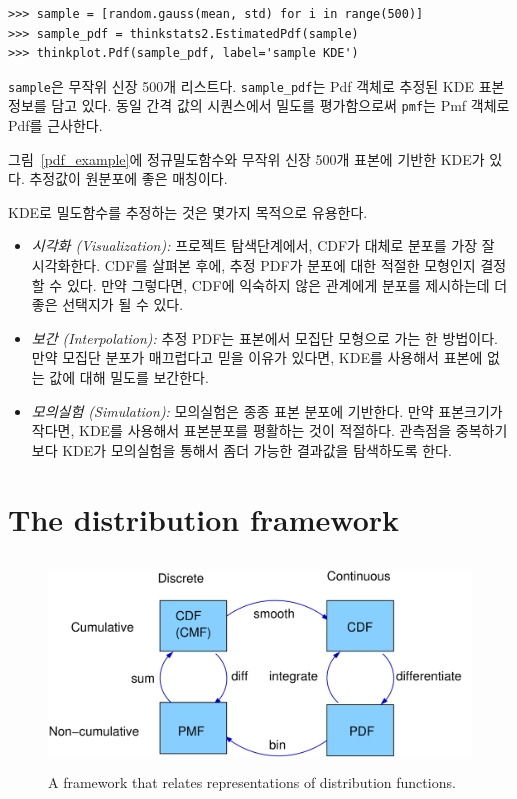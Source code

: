 \begin{verbatim}
>>> sample = [random.gauss(mean, std) for i in range(500)]
>>> sample_pdf = thinkstats2.EstimatedPdf(sample)
>>> thinkplot.Pdf(sample_pdf, label='sample KDE')
\end{verbatim}

\verb"sample"은 무작위 신장 500개 리스트다. 
\verb"sample_pdf"는 Pdf 객체로 추정된 KDE 표본정보를 담고 있다.
동일 간격 값의 시퀀스에서 밀도를 평가함으로써 {\tt pmf}는 Pmf 객체로 Pdf를 근사한다.

그림~\ref{pdf_example}에 정규밀도함수와 무작위 신장 500개 표본에 기반한 KDE가 있다. 추정값이 원분포에 좋은 매칭이다.

KDE로 밀도함수를 추정하는 것은 몇가지 목적으로 유용한다. 


\begin{itemize}

\item {\it 시각화 (Visualization):} 
  프로젝트 탐색단계에서, CDF가 대체로 분포를 가장 잘 시각화한다.
  CDF를 살펴본 후에, 추정 PDF가 분포에 대한 적절한 모형인지 결정할 수 있다.
  만약 그렇다면, CDF에 익숙하지 않은 관계에게 분포를 제시하는데 더 좋은 선택지가 될 수 있다.

\item {\it 보간 (Interpolation):} 
  추정 PDF는 표본에서 모집단 모형으로 가는 한 방법이다.
  만약 모집단 분포가 매끄럽다고 믿을 이유가 있다면, KDE를 사용해서 표본에 없는 값에 대해 밀도를 보간한다.

\item {\it 모의실험 (Simulation):} 
  모의실험은 종종 표본 분포에 기반한다. 
  만약 표본크기가 작다면, KDE를 사용해서 표본분포를 평활하는 것이 적절하다.
  관측점을 중복하기 보다 KDE가 모의실험을 통해서 좀더 가능한 결과값을 탐색하도록 한다.

\end{itemize}


\section{The distribution framework}

\begin{figure}
\centerline{\includegraphics[height=2.2in]{figs/distribution_functions.pdf}}
\caption{A framework that relates representations of distribution
functions.}
\label{dist_framework}
\end{figure}

